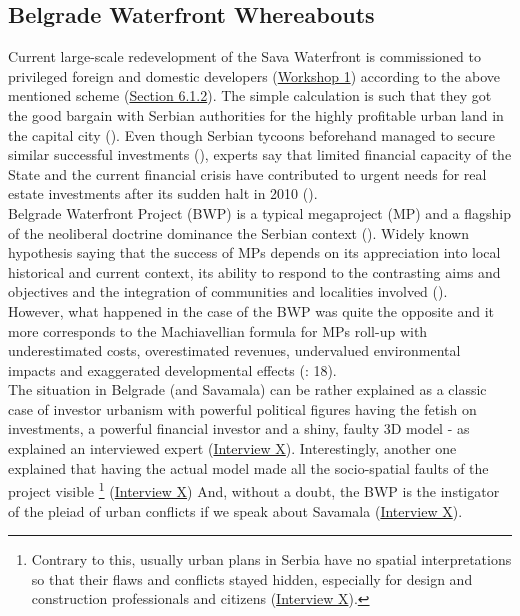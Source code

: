 \documentclass[11pt]{report}
\begin{document}
\subsection{Belgrade Waterfront Whereabouts}

Current large-scale redevelopment of the Sava Waterfront is commissioned to privileged foreign and domestic developers
(\href{Expert Workshop}{Workshop 1})
according to the above mentioned scheme (\href{Section 6.1.2}{Section 6.1.2}).
The simple calculation is such that they got the good bargain with Serbian authorities for the highly profitable urban land in the capital city (\cite{ref media}).
Even though Serbian tycoons beforehand managed to secure similar successful investments (\cite{ref slavka smederevo}), experts say that limited financial capacity of the State and  the  current  financial  crisis  have  contributed  to urgent needs for real estate investments after its sudden halt in 2010 (\href{ref}{\citealt{doytchinov_urban_2015}}).
\\

Belgrade Waterfront Project (BWP) is a typical megaproject (MP) and a flagship of the neoliberal doctrine dominance the Serbian context (\href{ref}{\citealt{harvey_rebel_2012}}).
Widely known hypothesis saying that the success of MPs depends on its appreciation into local historical and current context, its ability to respond to the contrasting aims and objectives and the integration of communities and localities involved (\href{ref}{\citealt{hoyle_global_2000}}).
\\

However, what happened in the case of the BWP was quite the opposite and it more corresponds to the Machiavellian formula for MPs roll-up with underestimated costs, overestimated
revenues, undervalued environmental impacts and exaggerated developmental effects (\cite{Flyvbjerg2005}: 18).
\\

The situation in Belgrade (and Savamala) can be rather explained as a classic case of investor urbanism with powerful political figures having the fetish on investments, a powerful financial investor and a shiny, faulty 3D model - as explained an interviewed expert
(\href{InterviewX}{Interview X}).
Interestingly, another one explained that having the actual model made all the socio-spatial faults of the project visible
\footnote{Contrary to this, usually urban plans in Serbia have no spatial interpretations so that their flaws and conflicts stayed hidden, especially for design and construction professionals and citizens (\href{InterviewX}{Interview X}).}
(\href{InterviewX}{Interview X})
And, without a doubt, the BWP is the instigator of the pleiad of urban conflicts if we speak about Savamala (\href{InterviewX}{Interview X}).
\\
\end{document}
